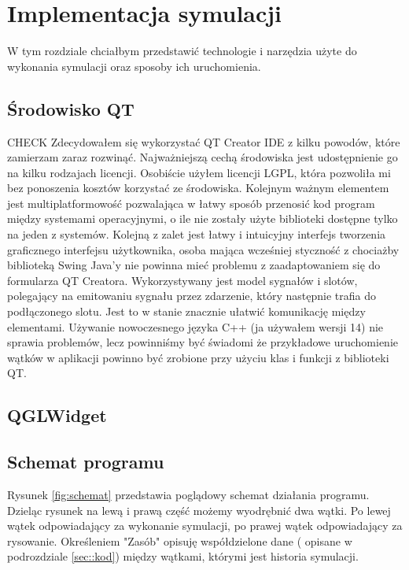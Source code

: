 \chapter{Implementacja symulacji}
\label{cha:implementacja}
W tym rozdziale chciałbym przedstawić technologie i narzędzia użyte do wykonania symulacji oraz sposoby ich uruchomienia.

\section{Środowisko QT}
\label{sec:qt}
{\color{red} CHECK}
Zdecydowałem się wykorzystać QT Creator IDE z kilku powodów, które zamierzam zaraz rozwinąć. Najważniejszą cechą środowiska jest udostępnienie go na kilku rodzajach licencji. Osobiście użyłem licencji LGPL, która pozwoliła mi bez ponoszenia kosztów korzystać ze środowiska. Kolejnym ważnym elementem jest multiplatformowość pozwalająca w łatwy sposób przenosić kod program między systemami operacyjnymi, o ile nie zostały użyte biblioteki dostępne tylko na jeden z systemów. Kolejną z zalet jest łatwy i intuicyjny interfejs tworzenia graficznego interfejsu użytkownika, osoba mająca wcześniej styczność z chociażby biblioteką Swing Java'y nie powinna mieć problemu z zaadaptowaniem się do  formularza QT Creatora. Wykorzystywany jest model sygnałów i slotów, polegający na emitowaniu sygnału przez zdarzenie, który następnie trafia do podłączonego slotu. Jest to w stanie znacznie ułatwić komunikację między elementami. Używanie nowoczesnego języka C++ (ja używałem wersji 14) nie sprawia problemów, lecz powinniśmy być świadomi że przykładowe uruchomienie wątków w aplikacji powinno być zrobione przy użyciu klas i funkcji z biblioteki QT.


\section{QGLWidget}
\label{sec:glwidget}


\section{Schemat programu}
\label{sec::schemat}
Rysunek \ref{fig:schemat} przedstawia poglądowy schemat działania programu. Dzieląc rysunek na lewą i prawą część możemy wyodrębnić dwa wątki. Po lewej wątek odpowiadający za wykonanie symulacji, po prawej wątek odpowiadający za rysowanie. Określeniem "Zasób" opisuję współdzielone dane ( opisane w podrozdziale \ref{sec::kod}) między wątkami, którymi jest historia symulacji. 

